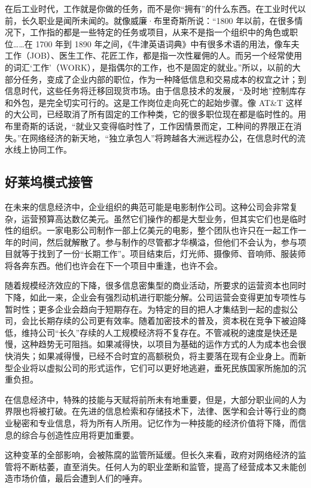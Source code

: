 在后工业时代，工作就是你做的任务，而不是你“拥有”的什么东西。在工业时代以前，长久职业是闻所未闻的。就像威廉·布里奇斯所说：“1800 年以前，在很多情况下，工作指的都是一些特定的任务或项目，从来不是指一个组织中的角色或职位……在 1700 年到 1890 年之间，《牛津英语词典》中有很多术语的用法，像车夫工作（JOB）、医生工作、花匠工作，都是指一次性雇佣的人。而另一个经常使用的词汇‘工作’（WORK），是指偶尔的工作，也不是固定的就业。”所以，以前的大部分任务，变成了企业内部的职位，作为一种降低信息和交易成本的权宜之计；到信息时代，这些任务将迁移回现货市场。由于信息技术的发展，“及时地”控制库存和外包，是完全切实可行的。这是工作岗位走向死亡的起始步骤。像 AT\&T 这样的大公司，已经取消了所有固定的工作种类，它的很多职位现在都是临时性的。用布里奇斯的话说，“就业又变得临时性了，工作因情景而定，工种间的界限正在消失。”在网络经济的新天地，“独立承包人”将跨越各大洲远程办公，在信息时代的流水线上协同工作。

\subsection{好莱坞模式接管}
在未来的信息经济中，企业组织的典范可能是电影制作公司。这种公司会非常复杂，运营预算高达数亿美元。虽然它们操作的都是大型业务，但其实它们也是临时性的组织。一家电影公司制作一部上亿美元的电影，整个团队也许只在一起工作一年的时间，然后就解散了。参与制作的尽管都才华横溢，但他们不会认为，参与项目就等于找到了一份“长期工作”。项目结束后，灯光师、摄像师、音响师、服装师将各奔东西。他们也许会在下一个项目中重逢，也许不会。

随着规模经济效应的下降，很多信息密集型的商业活动，所要求的运营资本也同时下降，如此一来，企业会有强烈动机进行职能分解。公司运营会变得更加专项性与暂时性；更多企业会趋向于短期存在。为特定的目的把人才集结到一起的虚拟公司，会比长期存续的公司更有效率。随着加密技术的普及，资本税在竞争下被迫降低，维持公司“长久”存续的人工规模经济将不复存在。不管减税的速度是快还是慢，这种趋势无可阻挡。如果减得快，以项目为基础的运作方式的人为成本也会很快消失；如果减得慢，已经不合时宜的高额税负，将主要落在现有企业身上。而新型企业将以虚拟公司的形式运作，它们可以更好地逃避，垂死民族国家所施加的沉重负担。

在信息经济中，特殊的技能与天赋将前所未有地重要，但是，大部分职业间的人为界限也将被打破。在先进的信息检索和存储技术下，法律、医学和会计等行业的商业秘密和专业信息，将为所有人所用。记忆作为一种技能的经济价值将下降，而信息的综合与创造性应用将更加重要。

这种变革的全部影响，会被陈腐的监管所延缓。但长久来看，政府对网络经济的监管将不断枯萎，直至消失。任何人为的职业垄断和监管，提高了经营成本又未能创造市场价值，最后会遭到人们的唾弃。

